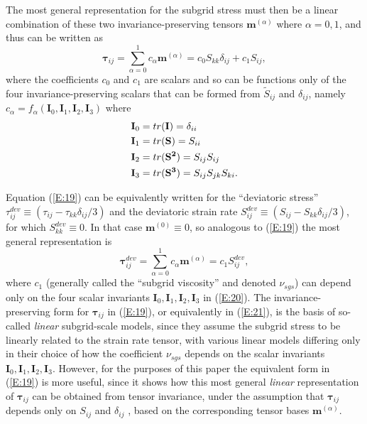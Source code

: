The most general representation for the subgrid stress must then be a linear combination of these two invariance-preserving tensors $\mathbf{m}^{(\alpha)}$  where $\alpha = 0,1$, and thus can be written as 
%
\begin{equation}
\label{E:19}
	\mathbf{\tau}_{ij} = \sum_{\alpha=0}^{1} c_{\alpha} \mathbf{m}^{(\alpha)}
	= c_0 S_{kk} \delta_{ij} + c_1 S_{ij},
\end{equation}
%
%        
where the coefficients $c_0$  and $c_1$  are scalars and so can be functions only of the four invariance-preserving scalars that can be formed from  $\widetilde{S}_{ij}$ and $\delta_{ij}$, namely  $c_{\alpha} = f_{\alpha} (\mathbf{I}_0, \mathbf{I}_1, \mathbf{I}_2,
\mathbf{I}_3)$ where 
%
\begin{subequations}
\label{E:20} \vspace{-0.25in}
\begin{align}
	\mathbf{I}_{0} &= tr(\mathbf{I})   = \delta_{ii} \\
	\mathbf{I}_{1} &= tr(\mathbf{S})   = S_{ii} \\
	\mathbf{I}_{2} &= tr(\mathbf{S^2}) = S_{ij}S_{ij} \\
	\mathbf{I}_{3} &= tr(\mathbf{S^3}) = S_{ij}S_{jk}S_{ki}. 
\end{align}
\end{subequations}
%
%   

Equation (\ref{E:19}) can be equivalently written for the ``deviatoric stress''  $\tau_{ij}^{dev} \equiv (\tau_{ij} - \tau_{kk}\delta_{ij}/3)$ and the deviatoric strain rate  $S_{ij}^{dev} \equiv (S_{ij} - S_{kk}\delta_{ij}/3)$, for which $S_{kk}^{dev} \equiv 0$. In that case $\mathbf{m}^{(0)} \equiv 0$, so analogous to (\ref{E:19}) the most general representation is
%
\begin{equation}
\label{E:21}
	\mathbf{\tau}_{ij}^{dev} = \sum_{\alpha=0}^{1} c_{\alpha} \mathbf{m}^{(\alpha)}
	= c_1 S_{ij}^{dev},
\end{equation}
%
%     
where  $c_1$ (generally called the ``subgrid viscosity'' and denoted $\nu_{sgs}$) can depend only on the four scalar invariants $\mathbf{I}_{0}, \mathbf{I}_{1}, \mathbf{I}_{2}, \mathbf{I}_{3}$  in (\ref{E:20}). The invariance-preserving form for $\mathbf{\tau}_{ij}$  in (\ref{E:19}), or equivalently in (\ref{E:21}), is the basis of so-called \textit{linear} subgrid-scale models, since they assume the subgrid stress to be linearly related to the strain rate tensor, with various linear models differing only in their choice of how the coefficient  $\nu_{sgs}$ depends on the scalar invariants $\mathbf{I}_{0}, \mathbf{I}_{1}, \mathbf{I}_{2}, \mathbf{I}_{3}$.  However, for the purposes of this paper the equivalent form in (\ref{E:19}) is more useful, since it shows how this most general \textit{linear} representation of $\mathbf{\tau}_{ij}$  can be obtained from tensor invariance, under the assumption that $\mathbf{\tau}_{ij}$  depends only on $S_{ij}$  and $\delta_{ij}$ , based on the corresponding tensor bases $\mathbf{m}^{(\alpha)}$. 
 

